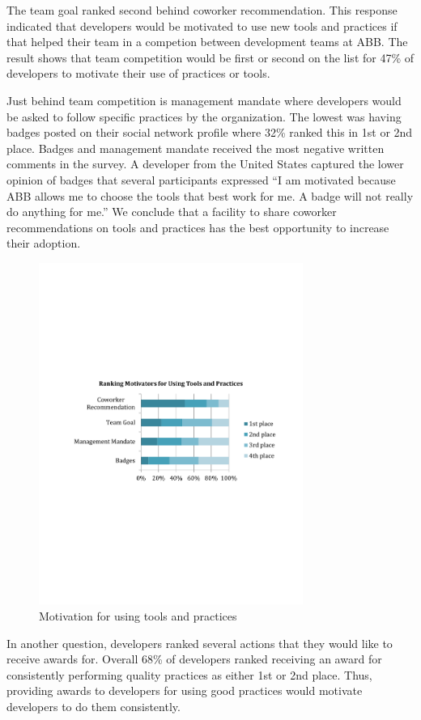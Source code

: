 \documentclass{sig-alternate}
\begin{document}
The team goal ranked second behind coworker recommendation.  This response indicated that developers would be motivated to use new tools and practices if that helped their team in a competion between development teams at ABB.  The result shows that team competition would be first or second on the list for  47\% of developers to motivate their use of practices or tools.  

Just behind team competition is management mandate where developers would be asked to follow specific practices by the organization.  The lowest was having badges posted on their social network profile where 32\% ranked this in 1st or 2nd place.   Badges and management mandate received the most negative written comments in the survey.  A developer from the United States captured the lower opinion of badges that several participants expressed ``I am motivated because ABB allows me to choose the tools that best work for me. A badge will not really do anything for me.''  We conclude that a facility to share coworker recommendations on tools and practices has the best opportunity to increase their adoption.  
 
\begin{figure}
	\includegraphics[width=3.4in]{ToolAndPracticeMotivators.pdf}
	\caption{Motivation for using tools and practices}
	\label{fig:toolandpracticemotivators}
\end{figure}

In another question, developers ranked several actions that they would like to receive awards for.  Overall 68\% of developers ranked receiving an award for consistently performing quality practices as either 1st or 2nd place.  Thus, providing awards to developers for using good practices would motivate developers to do them consistently.
\end{document}
